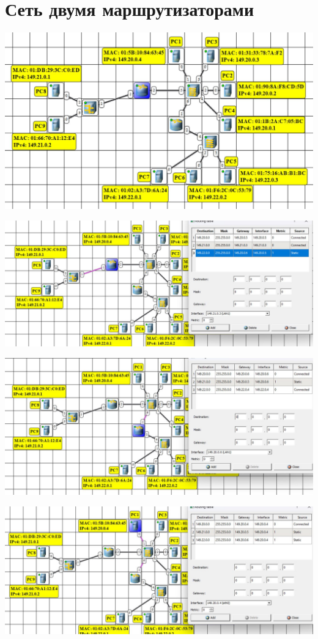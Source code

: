 \documentclass{article}
\begin{document}
\section*{Сеть двумя маршрутизаторами}
\begin{center}
    \includegraphics[width=.9\textwidth]{2-1}
\end{center}
\begin{center}
    \includegraphics[width=.9\textwidth]{2-2}
\end{center}
\begin{center}
    \includegraphics[width=.9\textwidth]{2-3}
\end{center}
\begin{center}
    \includegraphics[width=.9\textwidth]{2-4}
\end{center}
\end{document}
